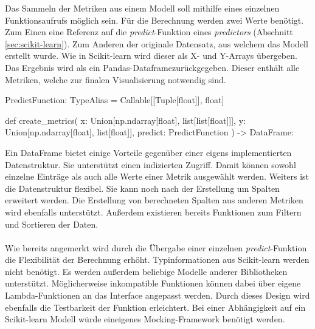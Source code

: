 Das Sammeln der Metriken aus einem Modell soll mithilfe eines einzelnen Funktionsaufrufs möglich sein. Für die Berechnung werden zwei Werte benötigt. Zum Einen eine Referenz auf die \emph{predict}-Funktion eines \emph{predictors} (Abschnitt \ref{sec:scikit-learn}). Zum Anderen der originale Datensatz, aus welchem das Modell erstellt wurde.  Wie in Scikit-learn wird dieser als X- und Y-Arrays übergeben. Das Ergebnis wird als ein Pandas-Dataframe\linebreak zurückgegeben. Dieser enthält alle Metriken, welche zur finalen Visualisierung notwendig sind.

\begin{PythonCode}
PredictFunction: TypeAlias = Callable[[Tuple[float]], float]

def create_metrics(
        x: Union[np.ndarray[float], list[list[float]]],
        y: Union[np.ndarray[float], list[float]],
        predict: PredictFunction
) -> DataFrame:
\end{PythonCode}

\noindent Ein DataFrame bietet einige Vorteile gegenüber einer eigens implementierten Datenstruktur. Sie unterstützt einen indizierten Zugriff. Damit können sowohl einzelne Einträge als auch alle Werte einer Metrik ausgewählt werden. Weiters ist die Datenstruktur flexibel. Sie kann noch nach der Erstellung um Spalten erweitert werden. Die Erstellung von berechneten Spalten aus anderen Metriken wird ebenfalls unterstützt. Außerdem existieren bereits Funktionen zum Filtern und Sortieren der Daten.\\\\

\noindent Wie bereits angemerkt wird durch die Übergabe einer einzelnen \emph{predict}-Funktion die Flexibilität der Berechnung erhöht. Typinformationen aus Scikit-learn werden nicht benötigt. Es werden außerdem beliebige Modelle anderer Bibliotheken unterstützt. Möglicherweise inkompatible Funktionen können dabei über eigene Lambda-Funktionen an das Interface angepasst werden. Durch dieses Design wird ebenfalls die Testbarkeit der Funktion erleichtert. Bei einer Abhängigkeit auf ein Scikit-learn Modell würde ein\linebreak eigenes Mocking-Framework benötigt werden.\\\\

